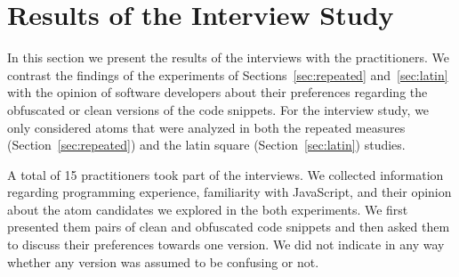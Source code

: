 

\section{Results of the Interview Study}
\label{sec:interview-results}

In this section we present the results of the interviews with the practitioners. We contrast the findings of the experiments of Sections~\ref{sec:repeated} and~\ref{sec:latin} with the opinion of software developers about their preferences regarding the obfuscated or clean versions of the code snippets. For the interview study, we only considered atoms that were analyzed in both the repeated measures (Section~\ref{sec:repeated}) and the latin square (Section~\ref{sec:latin}) studies. 


A total of 15 practitioners took part of the interviews.
We collected information regarding programming
experience, familiarity with JavaScript, and their opinion about the \na atom candidates we explored in the both experiments. We first presented them pairs of clean and obfuscated code snippets and then asked them to discuss their preferences towards one version. We did not indicate in any way whether any version was assumed to be confusing or not. 



